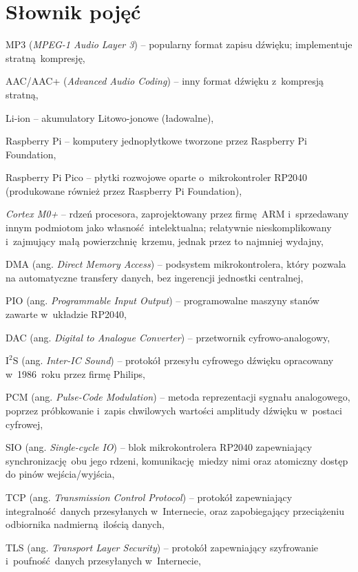 \documentclass[polish]{aghengthesis}
\let\tempone\itemize
\let\temptwo\enditemize
\renewenvironment{itemize}{\tempone\setlength{\itemsep}{0cm}}{\temptwo}
\newcommand{\isqs}{$\text{I}^{2}\text{S}$}
\begin{document}
	\section{Słownik pojęć}
	\begin{itemize}
		\setlength{\itemsep}{0.3cm}
		\item MP3 (\textit{MPEG-1 Audio Layer 3}) -- popularny format zapisu dźwięku; implementuje stratną kompresję,
		\item AAC/AAC+ (\textit{Advanced Audio Coding}) -- inny format dźwięku z~kompresją stratną,
		\item Li-ion -- akumulatory Litowo-jonowe (ładowalne),
		\item Raspberry Pi -- komputery jednopłytkowe tworzone przez Raspberry Pi Foundation,
		\item Raspberry Pi Pico -- płytki rozwojowe oparte o~mikrokontroler RP2040 (produkowane również przez Raspberry Pi Foundation),
		\item \textit{Cortex M0+} -- rdzeń procesora, zaprojektowany przez firmę ARM i~sprzedawany innym podmiotom jako własność intelektualna; relatywnie nieskomplikowany i~zajmujący małą powierzchnię krzemu, jednak przez to najmniej wydajny,
		\item DMA (ang. \textit{Direct Memory Access}) -- podsystem mikrokontrolera, który pozwala na automatyczne transfery danych, bez ingerencji jednostki centralnej,
		\item PIO (ang. \textit{Programmable Input Output}) -- programowalne maszyny stanów zawarte w~układzie RP2040,
		\item DAC (ang. \textit{Digital to Analogue Converter}) -- przetwornik cyfrowo-analogowy,
		\item \isqs{} (ang. \textit{Inter-IC Sound}) -- protokół przesyłu cyfrowego dźwięku opracowany w~1986~roku przez firmę Philips,
		\item PCM (ang. \textit{Pulse-Code Modulation}) -- metoda reprezentacji sygnału analogowego, poprzez próbkowanie i~zapis chwilowych wartości amplitudy dźwięku w~postaci cyfrowej,
		\item SIO (ang. \textit{Single-cycle IO}) -- blok mikrokontrolera RP2040 zapewniający synchronizację obu jego rdzeni, komunikację miedzy nimi oraz atomiczny dostęp do pinów wejścia/wyjścia,
		\item TCP (ang. \textit{Transmission Control Protocol}) -- protokół zapewniający integralność danych przesyłanych w~Internecie, oraz zapobiegający przeciążeniu odbiornika nadmierną ilością danych,
		\item TLS (ang. \textit{Transport Layer Security}) -- protokół zapewniający szyfrowanie i~poufność danych przesyłanych w~Internecie,
	\end{itemize}
\end{document}
